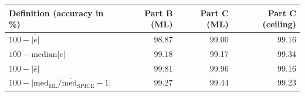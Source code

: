 \begin{tabular}{lrrr}
\toprule
Definition (accuracy in \%) & Part B (ML) & Part C (ML) & Part C (ceiling) \\
\midrule
$100-\overline{|e|}$ & 98.87 & 99.00 & 99.16 \\
$100-\mathrm{median}|e|$ & 99.18 & 99.17 & 99.34 \\
$100-|\bar e|$ & 99.81 & 99.96 & 99.16 \\
$100-\overline{|\mathrm{med}_{\mathrm{ML}}/\mathrm{med}_{\mathrm{SPICE}}-1|}$ & 99.27 & 99.44 & 99.23 \\
\bottomrule
\end{tabular}
